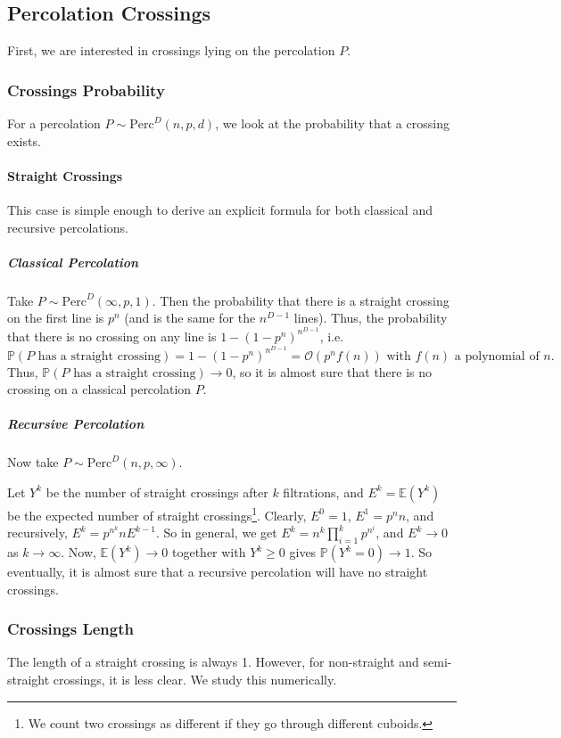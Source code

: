 \subsection{Percolation Crossings}
First, we are interested in crossings lying on the percolation $P$.

\subsubsection{Crossings Probability}
For a percolation $P \sim \text{Perc}^D(n,p,d)$, we look at the probability that a crossing exists.

\paragraph{Straight Crossings}
This case is simple enough to derive an explicit formula for both classical and recursive percolations.
\subparagraph{Classical Percolation}
Take $P \sim \text{Perc}^D(\infty,p,1)$.
Then the probability that there is a straight crossing on the first line is $p^n$ (and is the same for the $n^{D-1}$ lines).
Thus, the probability that there is no crossing on any line is $1-(1-p^n)^{n^{D-1}}$, i.e. 
$$\mathbb{P}(P \text{ has a straight crossing}) = 1-(1-p^n)^{n^{D-1}} = \mathcal{O}(p^n f(n)) \text{ with } f(n) \text{ a polynomial of } n.$$
Thus, $\mathbb{P}(P \text{ has a straight crossing}) \to 0$, so it is almost sure that there is no crossing on a classical percolation $P$.

\subparagraph{Recursive Percolation}
Now take $P \sim \text{Perc}^D(n,p,\infty)$.

Let $Y^k$ be the number of straight crossings after $k$ filtrations, and $E^k = \mathbb{E}(Y^k)$ be the expected number of straight crossings\footnote{We count two crossings as different if they go through different cuboids.}.
Clearly, $E^0 = 1$, $E^1 = p^nn$, and recursively, $E^k = p^{n^k}nE^{k-1}$.
So in general, we get $E^k = n^k \prod_{i=1}^{k} p^{n^i}$, and $E^k \to 0$ as $k \to \infty$.
Now, $\mathbb{E}(Y^k) \to 0$ together with $Y^k \geq 0$ gives $\mathbb{P}(Y^k = 0) \to 1$.
So eventually, it is almost sure that a recursive percolation will have no straight crossings.


\subsubsection{Crossings Length}
The length of a straight crossing is always 1.
However, for non-straight and semi-straight crossings, it is less clear.
We study this numerically.

